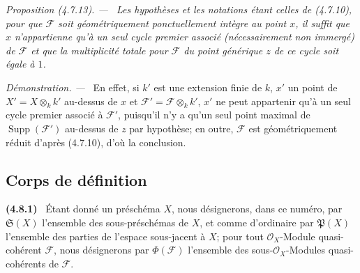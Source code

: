 \documentclass[10pt,oneside]{book}
\newenvironment{env}[1][]{\par\medskip\noindent\textbf{(#1)}\ }{\par}
\newenvironment{proposition}[1][]{%
  \par\medskip\noindent\itshape Proposition (#1). ---\ }{\par}
\newenvironment{proof}{%
  \par\medskip\noindent\textit{Démonstration. ---\ }}{\par}
\begin{document}
\begin{proposition}[4.7.13]
\label{IV.2.4.7.13-fr}
Les hypothèses et les notations étant celles de (4.7.10), pour que
$\mathscr F$ soit géométriquement ponctuellement intègre au point $x$, il
suffit que $x$ n'appartienne qu'à un seul cycle premier associé
(nécessairement non immergé) de $\mathscr F$ et que la multiplicité totale
pour $\mathscr F$ du point générique $z$ de ce cycle soit égale à $1$.
\end{proposition}

\begin{proof}
En effet, si $k'$ est une extension finie de $k$, $x'$ un point de
$X'=X\otimes_k k'$ au-dessus de $x$ et
$\mathscr F'=\mathscr F\otimes_k k'$, $x'$ ne peut appartenir qu'à un seul
cycle premier associé à $\mathscr F'$, puisqu'il n'y a qu'un seul point
maximal de $\operatorname{Supp}(\mathscr F')$ au-dessus de $z$ par hypothèse;
en outre, $\mathscr F$ est géométriquement réduit d'après (4.7.10), d'où la
conclusion.
\end{proof}
\subsection{Corps de définition}
\label{subsection:IV.4.8-fr}

\begin{env}[4.8.1]
\label{IV.2.4.8.1-fr}
Étant donné un préschéma $X$, nous désignerons, dans ce numéro, par
$\mathfrak S(X)$ l'ensemble des sous-préschémas de $X$, et comme d'ordinaire
par $\mathfrak P(X)$ l'ensemble des parties de l'espace sous-jacent à $X$;
pour tout $\mathcal O_X$-Module quasi-cohérent $\mathscr F$, nous désignerons
par $\Phi(\mathscr F)$ l'ensemble des sous-$\mathcal O_X$-Modules
quasi-cohérents de $\mathscr F$.
\end{env}
\end{document}
